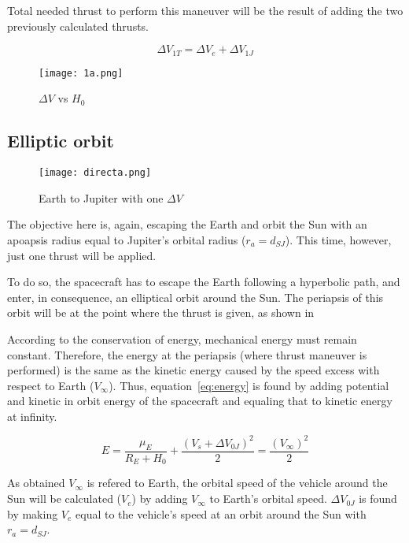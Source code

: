 Total needed thrust to perform this maneuver will be the result of adding the two previously calculated thrusts.

\begin{equation*}\label{eq:impuls1T}
\Delta V_{1T} = \Delta V_e + \Delta V_{1J}
\end{equation*}

\begin{figure}[H]
	\centering
		\texttt{[image: 1a.png]}
	\caption{$\Delta V$ vs $H_0$}
	\label{fig:1a}
\end{figure}


\subsection{Elliptic orbit}

\begin{figure}[H]
	\centering
		\texttt{[image: directa.png]}
	\caption{Earth to Jupiter with one $\Delta V$}
	\label{fig:direct}
\end{figure}


The objective here is, again, escaping the Earth and orbit the Sun with an apoapsis radius equal to Jupiter's orbital radius ($r_a = d_{SJ}$). This time, however, just one thrust will be applied.

To do so, the spacecraft has to escape the Earth following a hyperbolic path, and enter, in consequence, an elliptical orbit around the Sun. The periapsis of this orbit will be at the point where the thrust is given, as shown in~

According to the conservation of energy, mechanical energy must remain constant. Therefore, the energy at the periapsis (where thrust maneuver is performed) is the same as the kinetic energy caused by the speed excess with respect to Earth ($V_\infty$). Thus, equation~\ref{eq:energy} is found by adding potential and kinetic in orbit energy of the spacecraft and equaling that to kinetic energy at infinity.

\begin{equation}\label{eq:energy}
E=\frac{\mu_{E}}{R_E + H_0} + \frac{(V_s + \Delta V_{0J})^2}{2}=\frac{(V_{\infty})^2}{2}
\end{equation}

As obtained $V_\infty$ is refered to Earth, the  orbital speed of the vehicle around the Sun will be calculated ($V_e$) by adding $V_\infty$ to Earth's orbital speed.
$\Delta V_{0J}$ is found by making $V_e$ equal to the vehicle's speed at an orbit around the Sun with $r_a = d_{SJ}$.

